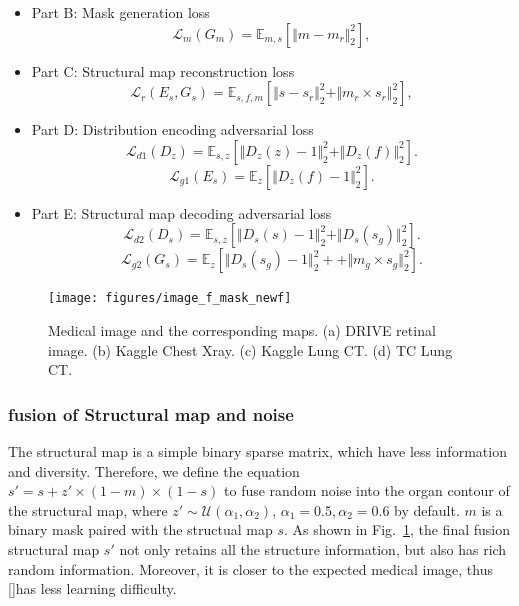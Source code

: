 \documentclass[runningheads]{llncs}
\begin{document}
	\begin{itemize}
		\item{Part B: Mask generation loss}
		\begin{equation}
		\mathcal{L}_{m}(G_m)=\mathbb{E}_{m,s}[\Vert{m-m_r}\Vert_{2}^{2}],
		\end{equation}
		\item{Part C: Structural map reconstruction loss} 
		\begin{equation}
		\mathcal{L}_{r}(E_s,G_s)=\mathbb{E}_{s,f,m}[\Vert{s-s_r}\Vert_{2}^{2}+\Vert{m_r\times s_r}\Vert_{2}^{2}],
		\end{equation}
		\item{Part D: Distribution encoding adversarial loss} 
		\begin{equation}
		\mathcal{L}_{d1}(D_{z})=\mathbb{E}_{s,z}[\Vert{D_{z}(z)-1}\Vert_{2}^{2}+\Vert{D_{z}(f)}\Vert_{2}^{2}].
		\end{equation}
		\begin{equation}
		\mathcal{L}_{g1}(E_s)=\mathbb{E}_{z}[\Vert{D_{z}(f)-1}\Vert_{2}^{2}].	
		\end{equation}
		\item{Part E: Structural map decoding adversarial loss} 
		\begin{equation}
		\mathcal{L}_{d2}(D_{s})=\mathbb{E}_{s,z}[\Vert{D_{s}(s)-1}\Vert_{2}^{2}+\Vert{D_{s}(s_g)}\Vert_{2}^{2}].
		\end{equation}
		\begin{equation}
		\mathcal{L}_{g2}(G_s)=\mathbb{E}_{z}[\Vert{D_{s}(s_g)-1}\Vert_{2}^{2}++\Vert{m_g\times s_g}\Vert_{2}^{2}].	
		\end{equation}
	\end{itemize}
	\begin{figure}[thbp!]
		\centering
		\texttt{[image: figures/image\_f\_mask\_newf]}
		\caption{Medical image and the corresponding maps. (a) DRIVE retinal image. (b) Kaggle Chest Xray. (c) Kaggle Lung CT. (d) TC Lung CT.}
		\label{image_and_f}
	\end{figure}	
	\subsubsection{fusion of Structural map and noise}	
	The structural map is a simple binary sparse matrix, which have less information and diversity. Therefore, we define the equation $s'=s+z'\times(1-m)\times(1-s)$ to fuse random noise into the organ contour of the structural map, where $z'\sim\mathcal{U}(\alpha_1,\alpha_2)$, $\alpha_1 =0.5,\alpha_2=0.6$ by default. $m$ is a binary mask paired with the structual map $s$. As shown in Fig.~\ref{image_and_f}, the final fusion structural map $s'$ not only retains all the structure information, but also has rich random information. Moreover, it is closer to the expected medical image, thus []has less learning difficulty. 
\end{document}
